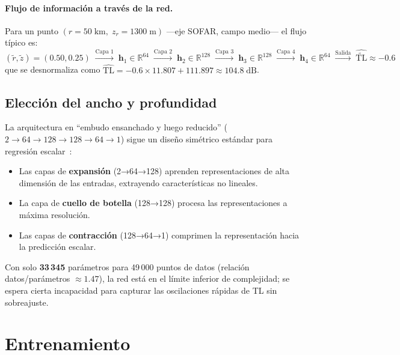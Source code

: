 \documentclass[12pt,a4paper]{article}
\newcommand{\TL}{\mathrm{TL}}
\newcommand{\rnorm}{\tilde{r}}
\newcommand{\znorm}{\tilde{z}}
\newcommand{\TLnorm}{\widetilde{\TL}}
\begin{document}
\paragraph{Flujo de información a través de la red.}
Para un punto $(r=50\;\mathrm{km},\;z_r=1300\;\mathrm{m})$ —eje SOFAR,
campo medio— el flujo típico es:
\[
  (\rnorm, \znorm) = (0.50, 0.25)
  \;\xrightarrow{\text{Capa 1}}\;
  \mathbf{h}_1 \in \mathbb{R}^{64}
  \;\xrightarrow{\text{Capa 2}}\;
  \mathbf{h}_2 \in \mathbb{R}^{128}
  \;\xrightarrow{\text{Capa 3}}\;
  \mathbf{h}_3 \in \mathbb{R}^{128}
  \;\xrightarrow{\text{Capa 4}}\;
  \mathbf{h}_4 \in \mathbb{R}^{64}
  \;\xrightarrow{\text{Salida}}\;
  \hat{\TLnorm} \approx -0.6
\]
que se desnormaliza como $\hat{\TL} = -0.6 \times 11.807 + 111.897 \approx 104.8\;\mathrm{dB}$.

\subsection{Elección del ancho y profundidad}

La arquitectura en ``embudo ensanchado y luego reducido''
($2 \to 64 \to 128 \to 128 \to 64 \to 1$) sigue un diseño simétrico
estándar para regresión escalar~\cite{goodfellow2016}:

\begin{itemize}[nosep]
  \item Las capas de \textbf{expansión} (2→64→128) aprenden representaciones
        de alta dimensión de las entradas, extrayendo características no lineales.
  \item La capa de \textbf{cuello de botella} (128→128) procesa las
        representaciones a máxima resolución.
  \item Las capas de \textbf{contracción} (128→64→1) comprimen la representación
        hacia la predicción escalar.
\end{itemize}

Con solo \textbf{33\,345} parámetros para 49\,000 puntos de datos (relación
datos/parámetros $\approx 1.47$), la red está en el límite inferior de
complejidad; se espera cierta incapacidad para capturar las oscilaciones
rápidas de TL sin sobreajuste.

\section{Entrenamiento}
\end{document}
